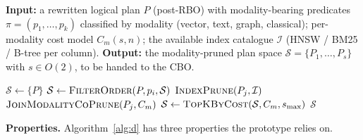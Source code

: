 \documentclass[sigconf,nonacm,review]{acmart}
\theoremstyle{plain}
\theoremstyle{definition}
\theoremstyle{remark}
\begin{document}
\begin{algorithm}[t]
\caption{Cross-modal plan enumeration (D).}\label{alg:d}
\textbf{Input:} a rewritten logical plan $P$ (post-RBO) with
modality-bearing predicates
$\pi = (p_1, \ldots, p_k)$ classified by modality
(vector, text, graph, classical); per-modality cost model
$C_m(s, n)$; the available index catalogue
$\mathcal{I}$ (HNSW / BM25 / B-tree per column).
\textbf{Output:} the modality-pruned plan space
$\mathcal{S} = \{P_1, \ldots, P_s\}$ with $s \in O(2)$, to be
handed to the CBO.
\begin{algorithmic}[1]
  \State $\mathcal{S} \gets \{P\}$
    \State $\mathcal{S} \gets \Call{FilterOrder}{P, p_i, \mathcal{S}}$
  \EndFor
    \State $\Call{IndexPrune}{P_j, \mathcal{I}}$
  \EndFor
    \State $\Call{JoinModalityCoPrune}{P_j, C_m}$
  \EndFor
    \State $\mathcal{S} \gets \Call{TopKByCost}{\mathcal{S}, C_m, s_{\max}}$
  \EndIf
  \State \Return $\mathcal{S}$
\end{algorithmic}
\end{algorithm}

\noindent\textbf{Properties.}
Algorithm~\ref{alg:d} has three properties the prototype relies on.
\end{document}
